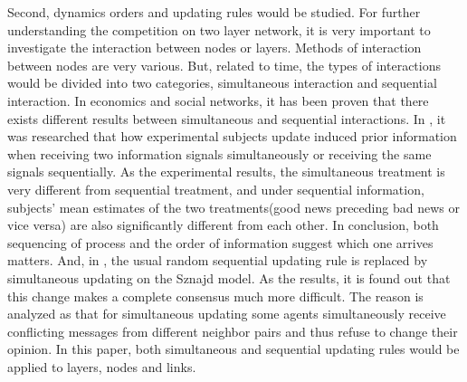 Second, dynamics orders and updating rules would be studied. For further understanding the competition on two layer network, it is very important to investigate the interaction between nodes or layers. Methods of interaction between nodes are very various.\parencite{sirbu2017} But, related to time, the types of interactions  would be divided into two categories, simultaneous interaction and sequential interaction. In economics and social networks, it has been proven that there exists different results between simultaneous and sequential interactions.\parencite{hoffman2011, dietrich2004} In \parencite{hoffman2011}, it was researched that how experimental subjects update induced prior information when receiving two information signals simultaneously or receiving the same signals sequentially. As the experimental results, the simultaneous treatment is very different from sequential treatment, and under sequential information,  subjects’ mean estimates of the two treatments(good news preceding bad news or vice versa) are also significantly different from each other. In conclusion, both sequencing of process and the order of information suggest which one arrives matters. And, in \parencite{dietrich2004}, the usual random sequential updating rule is replaced by simultaneous updating on the Sznajd model. As the results, it is found out that this change makes a complete consensus much more difficult. The reason is analyzed as that for simultaneous updating some agents simultaneously receive conflicting messages from different neighbor pairs and thus refuse to change their opinion. In this paper, both simultaneous and sequential updating rules would be applied to layers, nodes and links. 

